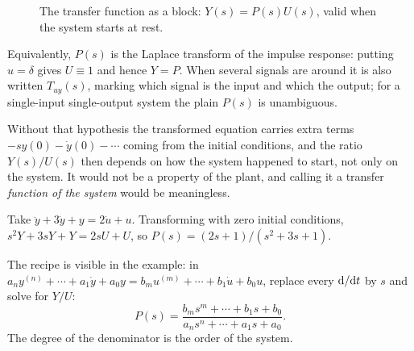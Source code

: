 \documentclass[11pt]{article}
\begin{document}
\begin{figure}[htb]
\centering
{}
\caption{The transfer function as a block: $Y(s)=P(s)U(s)$, valid when the system
starts at rest.}
\label{fig:tfblock}
\end{figure}

Equivalently, $P(s)$ is the Laplace transform of the impulse response: putting
$u=\delta$ gives $U\equiv1$ and hence $Y=P$. When several signals are around it
is also written $T_{uy}(s)$, marking which signal is the input and which the
output; for a single-input single-output system the plain $P(s)$ is unambiguous.

\begin{remark}
Without that hypothesis the transformed equation carries extra terms
$-sy(0)-\dot y(0)-\cdots$ coming from the initial conditions, and the ratio
$Y(s)/U(s)$ then depends on how the system happened to start, not only on the
system. It would not be a property of the plant, and calling it a transfer
\emph{function of the system} would be meaningless.
\end{remark}

\begin{example}\label{ex:tf}
Take $\ddot y + 3\dot y + y = 2\dot u + u$. Transforming with zero initial
conditions, $s^{2}Y+3sY+Y = 2sU+U$, so
$P(s) = (2s+1)/(s^{2}+3s+1)$.
\end{example}
The recipe is visible in the example: in
$a_n y^{(n)}+\cdots+a_1\dot y+a_0y = b_m u^{(m)}+\cdots+b_1\dot u+b_0u$,
replace every $\mathrm{d}/\mathrm{d} t$ by $s$ and solve for $Y/U$:
\[
   P(s) = \frac{b_ms^{m}+\cdots+b_1s+b_0}{a_ns^{n}+\cdots+a_1s+a_0} .
\]
The degree of the denominator is the order of the system.
\end{document}
